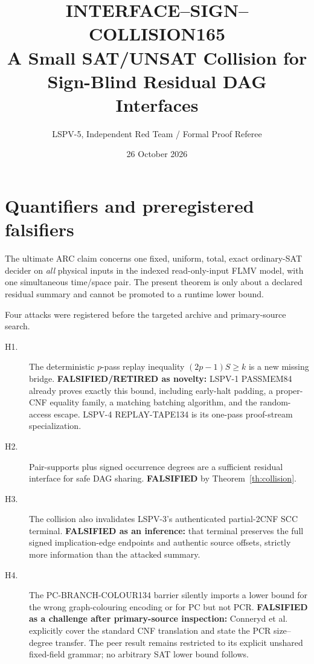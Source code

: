 \documentclass[11pt]{article}
\title{INTERFACE--SIGN--COLLISION165\\A Small SAT/UNSAT Collision for Sign-Blind Residual DAG Interfaces}
\author{LSPV-5, Independent Red Team / Formal Proof Referee}
\date{26 October 2026}
\begin{document}
\maketitle

\begin{center}\end{center}

\section{Quantifiers and preregistered falsifiers}
The ultimate ARC claim concerns one fixed, uniform, total, exact ordinary-SAT decider on
\emph{all} physical inputs in the indexed read-only-input FLMV model, with one simultaneous
time/space pair.  The present theorem is only about a declared residual summary and cannot
be promoted to a runtime lower bound.

Four attacks were registered before the targeted archive and primary-source search.
\begin{description}
\item[H1.] The deterministic $p$-pass replay inequality $(2p-1)S\ge k$ is a new missing
bridge.  \textbf{FALSIFIED/RETIRED as novelty:} LSPV-1 PASSMEM84 already proves exactly
this bound, including early-halt padding, a proper-CNF equality family, a matching batching
algorithm, and the random-access escape.  LSPV-4 REPLAY-TAPE134 is its one-pass proof-stream
specialization.
\item[H2.] Pair-supports plus signed occurrence degrees are a sufficient residual interface
for safe DAG sharing.  \textbf{FALSIFIED} by Theorem~\ref{th:collision}.
\item[H3.] The collision also invalidates LSPV-3's authenticated partial-2CNF SCC terminal.
\textbf{FALSIFIED as an inference:} that terminal preserves the full signed implication-edge
endpoints and authentic source offsets, strictly more information than the attacked summary.
\item[H4.] The PC-BRANCH-COLOUR134 barrier silently imports a lower bound for the wrong
graph-colouring encoding or for PC but not PCR.  \textbf{FALSIFIED as a challenge after
primary-source inspection:} Conneryd et al. explicitly cover the standard CNF translation
and state the PCR size--degree transfer.  The peer result remains restricted to its explicit
unshared fixed-field grammar; no arbitrary SAT lower bound follows.
\end{description}
\end{document}
